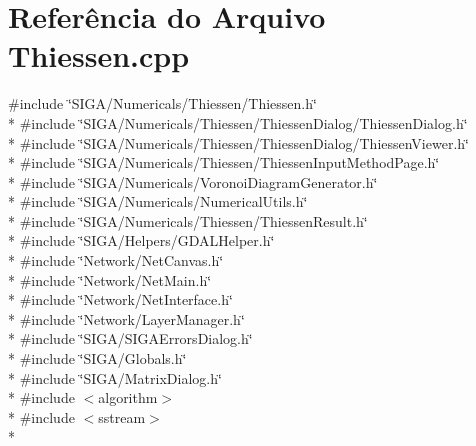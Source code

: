 \section{Referência do Arquivo Thiessen.\+cpp}
\label{_thiessen_8cpp}
{\ttfamily \#include \char`\"{}S\+I\+G\+A/\+Numericals/\+Thiessen/\+Thiessen.\+h\char`\"{}}\\*
{\ttfamily \#include \char`\"{}S\+I\+G\+A/\+Numericals/\+Thiessen/\+Thiessen\+Dialog/\+Thiessen\+Dialog.\+h\char`\"{}}\\*
{\ttfamily \#include \char`\"{}S\+I\+G\+A/\+Numericals/\+Thiessen/\+Thiessen\+Dialog/\+Thiessen\+Viewer.\+h\char`\"{}}\\*
{\ttfamily \#include \char`\"{}S\+I\+G\+A/\+Numericals/\+Thiessen/\+Thiessen\+Input\+Method\+Page.\+h\char`\"{}}\\*
{\ttfamily \#include \char`\"{}S\+I\+G\+A/\+Numericals/\+Voronoi\+Diagram\+Generator.\+h\char`\"{}}\\*
{\ttfamily \#include \char`\"{}S\+I\+G\+A/\+Numericals/\+Numerical\+Utils.\+h\char`\"{}}\\*
{\ttfamily \#include \char`\"{}S\+I\+G\+A/\+Numericals/\+Thiessen/\+Thiessen\+Result.\+h\char`\"{}}\\*
{\ttfamily \#include \char`\"{}S\+I\+G\+A/\+Helpers/\+G\+D\+A\+L\+Helper.\+h\char`\"{}}\\*
{\ttfamily \#include \char`\"{}Network/\+Net\+Canvas.\+h\char`\"{}}\\*
{\ttfamily \#include \char`\"{}Network/\+Net\+Main.\+h\char`\"{}}\\*
{\ttfamily \#include \char`\"{}Network/\+Net\+Interface.\+h\char`\"{}}\\*
{\ttfamily \#include \char`\"{}Network/\+Layer\+Manager.\+h\char`\"{}}\\*
{\ttfamily \#include \char`\"{}S\+I\+G\+A/\+S\+I\+G\+A\+Errors\+Dialog.\+h\char`\"{}}\\*
{\ttfamily \#include \char`\"{}S\+I\+G\+A/\+Globals.\+h\char`\"{}}\\*
{\ttfamily \#include \char`\"{}S\+I\+G\+A/\+Matrix\+Dialog.\+h\char`\"{}}\\*
{\ttfamily \#include $<$algorithm$>$}\\*
{\ttfamily \#include $<$sstream$>$}\\*
